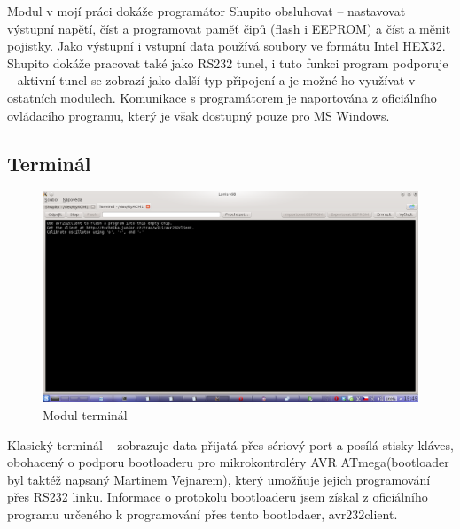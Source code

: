 \documentclass[12pt, a4paper, oneside]{article}
\begin{document}
Modul v mojí práci dokáže programátor Shupito obsluhovat -- nastavovat výstupní napětí, číst a programovat paměť čipů (flash i EEPROM) a číst a měnit pojistky. Jako výstupní i vstupní data používá soubory ve formátu Intel HEX32\cite{hex}. Shupito dokáže pracovat také jako RS232 tunel, i tuto funkci program podporuje -- aktivní tunel se zobrazí jako další typ připojení a je možné ho využívat v ostatních modulech.
Komunikace s programátorem je naportována z oficiálního ovládacího programu\cite{avr232client}, který je však dostupný pouze pro MS Windows.
\newpage
\setlength{\voffset}{0mm} %
\pagestyle{plain}

\subsection*{Terminál}

\begin{figure}[h]
\begin{center}
\includegraphics[width=\textwidth]{img/terminal.png}
\caption{Modul terminál}
\label{Terminal}
\end{center}
\end{figure}

Klasický terminál -- zobrazuje data přijatá přes sériový port a posílá stisky kláves, obohacený o podporu bootloaderu pro mikrokontroléry AVR ATmega(bootloader byl taktéž napsaný Martinem Vejnarem), který umožňuje jejich programování přes RS232 linku. Informace o protokolu bootloaderu jsem získal z oficiálního programu určeného k programování přes tento bootlodaer, avr232client\cite{avr232client}.

\newpage
\setlength{\voffset}{0mm} %
\pagestyle{plain}
\end{document}
